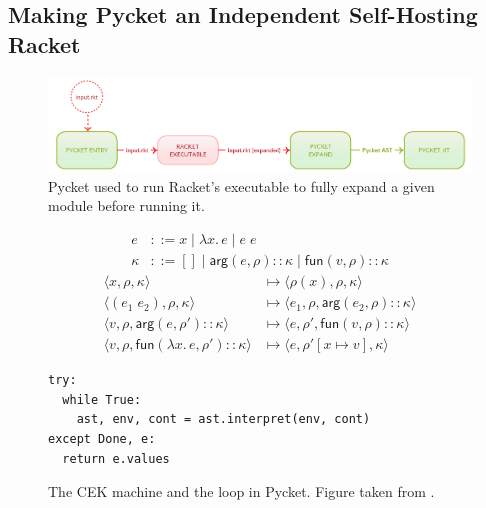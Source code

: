 \subsection{Making Pycket an Independent Self-Hosting Racket}
\label{subsec:pycket}

\begin{figure}[h!]
  \centering \includegraphics[scale=0.3]{img/old-pycket-2}
\caption{Pycket used to run Racket's executable to fully expand a given module before running it.}
\label{fig:old-pycket}
\end{figure}


\begin{figure}
  \vspace{-0.8cm}
  \small
\begin{align*}
e &::= x \mid \lambda x.\, e \mid e \; e\\
\kappa &::= [] \mid \mathsf{arg}(e,\rho){::}\kappa \mid \mathsf{fun}(v,\rho){::}\kappa
\end{align*}
\begin{align*}
\langle x, \rho, \kappa \rangle & \longmapsto
    \langle \rho(x), \rho, \kappa \rangle \\
\langle (e_1 \; e_2), \rho, \kappa \rangle & \longmapsto
    \langle e_1, \rho, \mathsf{arg}(e_2, \rho){::}\kappa \rangle \\
\langle v, \rho, \mathsf{arg}(e,\rho'){::}\kappa \rangle & \longmapsto
    \langle e, \rho', \mathsf{fun}(v,\rho){::}\kappa \rangle \\
\langle v, \rho, \mathsf{fun}(\lambda x. \, e, \rho'){::}\kappa \rangle & \longmapsto
    \langle e, \rho'[x\mapsto v], \kappa \rangle
\end{align*}
\begin{lstlisting}[mathescape]
try:
  while True:
    ast, env, cont = ast.interpret(env, cont)
except Done, e:
  return e.values
\end{lstlisting}
\caption{The CEK machine and the loop in Pycket. Figure taken from \cite{pycket15}.}
\label{fig:cek}
\end{figure}


